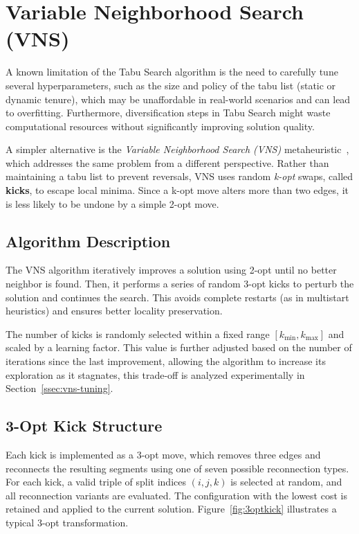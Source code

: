 \clearpage

\section{Variable Neighborhood Search (VNS)}

A known limitation of the Tabu Search algorithm is the need to carefully tune several hyperparameters, such as the size and policy 
of the tabu list (static or dynamic tenure), which may be unaffordable in real-world scenarios and can lead to overfitting. 
Furthermore, diversification steps in Tabu Search might waste computational resources without significantly improving solution quality.

A simpler alternative is the \textit{Variable Neighborhood Search (VNS)} metaheuristic~\cite{Hansen2009}, 
which addresses the same problem from a different perspective. Rather than maintaining a tabu list to prevent reversals, 
VNS uses random \textit{k-opt} swaps, called \textbf{kicks}, to escape local minima. Since a k-opt move alters more than two edges, 
it is less likely to be undone by a simple 2-opt move.

\subsection{Algorithm Description}

The VNS algorithm iteratively improves a solution using 2-opt until no better neighbor is found. Then, it performs a series of random 3-opt kicks 
to perturb the solution and continues the search. This avoids complete restarts (as in multistart heuristics) and ensures better locality preservation.

The number of kicks is randomly selected within a fixed range $[k_{\text{min}}, k_{\text{max}}]$ and scaled by a learning factor. 
This value is further adjusted based on the number of iterations since the last improvement, allowing the algorithm to increase its exploration as it stagnates, this trade-off is analyzed experimentally in Section~\ref{ssec:vns-tuning}.

\subsection{3-Opt Kick Structure}

Each kick is implemented as a 3-opt move, which removes three edges and reconnects the resulting segments using one of seven possible reconnection types. 
For each kick, a valid triple of split indices $(i, j, k)$ is selected at random, and all reconnection variants are evaluated. 
The configuration with the lowest cost is retained and applied to the current solution. Figure~\ref{fig:3optkick} illustrates a typical 3-opt transformation.

